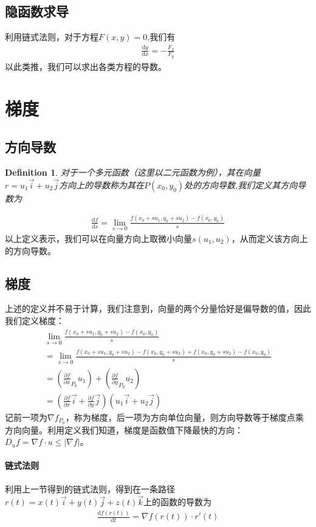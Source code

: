 \documentclass[12pt,a4paper,UTF8]{ctexbook}
\theoremstyle{plain}
\newtheorem{definition}{\indent Definition}[section]
\begin{document}
\subsection{隐函数求导}
利用链式法则，对于方程$F(x,y)=0$,我们有
\begin{align*}
\frac{\mathrm dy}{\mathrm dx}=-\frac{F_x}{F_y}
\end{align*}
以此类推，我们可以求出各类方程的导数。

\section{梯度}
\subsection{方向导数}
\begin{definition}
对于一个多元函数（这里以二元函数为例），其在向量$r=u_1 \vec i +u_2 \vec j$方向上的导数称为其在$P(x_0,y_0)$处的方向导数,我们定义其方向导数为
\end{definition}
\begin{align*}
    \frac{\mathrm d f}{\mathrm d s} =\lim_{s\to 0}\frac{f(x_0+su_1,y_0+su_2)-f(x_0,y_0)}{s}
\end{align*}
以上定义表示，我们可以在向量方向上取微小向量$s(u_1,u_2)$，从而定义该方向上的方向导数。
\subsection{梯度}
上述的定义并不易于计算，我们注意到，向量的两个分量恰好是偏导数的值，因此我们定义梯度：
\begin{align*}
    &\lim_{s\to 0}\frac{f(x_0+su_1,y_0+su_2)-f(x_0,y_0)}{s}&\\
    &=\lim_{s\to 0}\frac{f(x_0+su_1,y_0+su_2)-f(x_0,y_0+su_2)+f(x_0,y_0+su_2)-f(x_0,y_0)}{s}&\\
    &=(\frac{\partial f}{\partial x}_{P_0}u_1)+(\frac{\partial f}{\partial y}_{P_0}u_2)&\\
    &=(\frac{\partial f}{\partial x}\vec i+\frac{\partial f}{\partial y}\vec j)(u_1\vec i+u_2\vec j)&
\end{align*}
记前一项为$\nabla f_{P_0}$，称为梯度，后一项为方向单位向量，则方向导数等于梯度点乘方向向量。利用定义我们知道，梯度是函数值下降最快的方向：$D_u f=\nabla f\cdot u\leq |\nabla f|$。
\paragraph{链式法则}利用上一节得到的链式法则，得到在一条路径$r(t)=x(t)\vec i+y(t)\vec j+z(t)\vec k$上的函数的导数为
\begin{align*}
\frac{\mathrm d f(r(t))}{\mathrm d t}=\nabla f(r(t))\cdot r'(t)
\end{align*}
\end{document}

